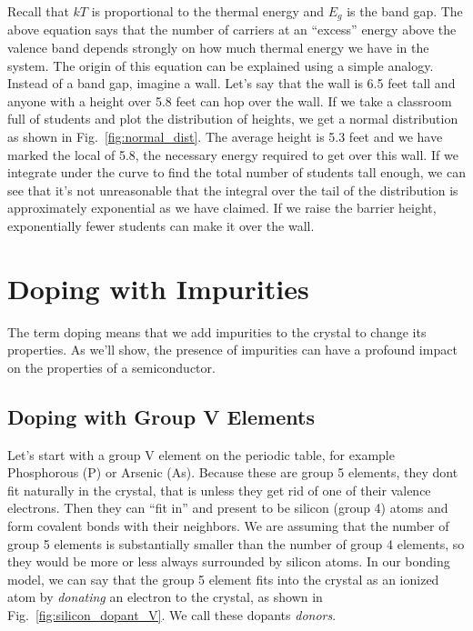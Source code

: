 Recall that $kT$ is proportional to the thermal energy and  $E_g$ is the band gap.  The above equation says that the number of carriers at an “excess” energy above the valence band depends strongly on how much thermal energy we have in the system.  The origin of this equation can be explained using a simple analogy.  Instead of a band gap, imagine a wall.  Let’s say that the wall is 6.5 feet tall and anyone with a height over 5.8 feet can hop over the wall.  If we take a classroom full of students and plot the distribution of heights, we get a normal distribution as shown in Fig.~\ref{fig:normal_dist}.  The average height is 5.3 feet and we have marked the local of 5.8, the necessary energy required to get over this wall.  If we integrate under the curve to find the total number of students tall enough, we can see that it’s not unreasonable that the integral over the tail of the distribution is approximately exponential as we have claimed.  If we raise the barrier height, exponentially fewer students can make it over the wall.


\section{Doping with Impurities}


The term doping means that we add impurities to the crystal to change its properties.  As we’ll show, the presence of impurities can have a profound impact on the properties of a semiconductor.


\subsection{Doping with Group V Elements}


Let’s start with a group V element on the periodic table, for example Phosphorous (P) or Arsenic (As).  Because these are group 5 elements, they dont fit naturally in the crystal, that is unless they get rid of one of their valence electrons.  Then they can “fit in” and present to be silicon (group 4) atoms and form covalent bonds with their neighbors.  We are assuming that the number of group 5 elements is substantially smaller than the number of group 4 elements, so they would be more or less always surrounded by silicon atoms.  In our bonding model, we can say that the group 5 element fits into the crystal as an ionized atom by \emph{donating} an electron to the crystal, as shown in Fig.~\ref{fig:silicon_dopant_V}.   We call these dopants \emph{donors}.




